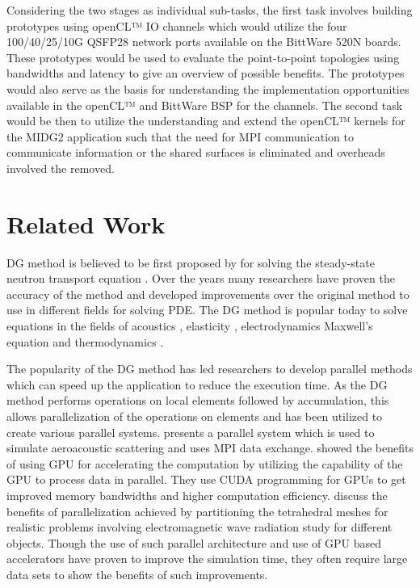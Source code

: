 Considering the two stages as individual sub-tasks, the first task involves building
prototypes using openCL™ IO channels which would utilize the four 100/40/25/10G QSFP28
network ports available on the BittWare 520N boards. These prototypes would be used
to evaluate the point-to-point topologies using bandwidths and latency to give an
overview of possible benefits. The prototypes would also serve as the basis for
understanding the implementation opportunities available in the openCL™ and
BittWare BSP for the channels. The second task would be then to utilize the
understanding and extend the openCL™ kernels for the MIDG2 application
such that the need for MPI communication to communicate information or the shared
surfaces is eliminated and overheads involved the removed.


\section{Related Work}

\ac{DG} method is believed to be first proposed by \textcite{reed_triangular_1973} for
solving the steady-state neutron transport equation \cite{hesthaven_nodal_2008}. Over the
years many researchers have proven the accuracy of the method and developed improvements
over the original method to use in different fields for solving \ac{PDE}. The \ac{DG} method
is popular today to solve equations in the fields of acoustics \cite{wilcox_high-order_2010,
atkins_quadrature-free_1998, toulopoulos_high-order_2006}, elasticity \cite{dumbser_arbitrary_2006,
kaser_arbitrary_2006, kaser_arbitrary_2007}, electrodynamics Maxwell’s equation \cite{busch_discontinuous_2011,
cohen_discontinuous_2006, busch_discontinuous_2011, cohen_spatial_2006, cockburn_locally_2004,
konig_discontinuous_2010} and thermodynamics \cite{collis_discontinuous_2002}.

The popularity of the \ac{DG} method has led researchers to develop parallel methods
which can speed up the application to reduce the execution time. As the DG method
performs operations on local elements followed by accumulation, this allows parallelization
of the operations on elements and has been utilized to create various parallel systems.
\textcite{baggag_parallel_1999} presents a parallel system which is used to simulate aeroacoustic
scattering and uses MPI data exchange. \textcite{klockner_nodal_2009} showed the benefits
of using GPU for accelerating the computation by utilizing the capability of the GPU to
process data in parallel. They use CUDA programming for GPUs to get improved memory bandwidths
and higher computation efficiency. \textcite{bernacki_parallel_2006} discuss the benefits
of parallelization achieved by partitioning the tetrahedral meshes for realistic problems
involving electromagnetic wave radiation study for different objects. Though the use of such
parallel architecture and use of GPU based accelerators have proven
to improve the simulation time, they often require large data sets to show the benefits of
such improvements.

